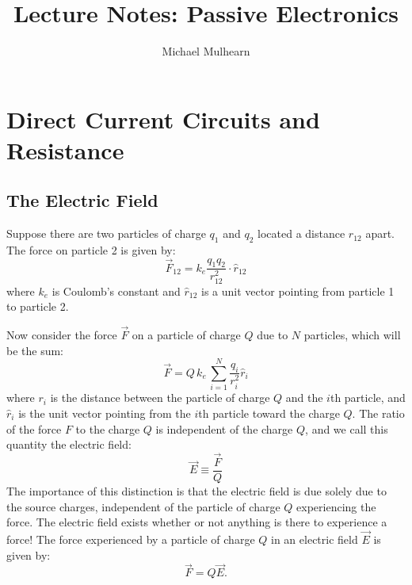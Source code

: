\documentclass[12pt,oneside]{book}
\begin{document}

\title{Lecture Notes:  Passive Electronics}
\author{Michael Mulhearn}

\maketitle

\chapter{Direct Current Circuits and Resistance}

\section{The Electric Field}

Suppose there are two particles of charge $q_1$ and $q_2$ located a distance $r_{12}$ apart.
The force on particle 2 is given by:
\begin{displaymath}
\vec{F}_{12} = k_e \frac{q_1 q_2}{r_{12}^2} \cdot \hat{r}_{12}
\end{displaymath}
where $k_e$ is Coulomb's constant and $\hat{r}_{12}$ is a unit vector pointing from particle 1 to particle 2.

Now consider the force $\vec{F}$ on a particle of charge $Q$ due to $N$ particles, which will be the sum:
\begin{displaymath}
\vec{F} = Q \, k_e \, \sum_{i=1}^N \frac{q_i}{r_{i}^2} \hat{r}_{i}
\end{displaymath}
where $r_i$ is the distance between the particle of charge $Q$ and the $i$th particle, and $\hat{r}_i$ is the unit vector pointing from the $i$th particle toward the charge $Q$.  The ratio of the force $F$ to the charge $Q$ is independent of the charge $Q$, and we call this quantity the electric field:
\begin{displaymath}
\vec{E} \equiv \frac{\vec{F}}{Q}
\end{displaymath}
The importance of this distinction is that the electric field is due solely due to the source charges, independent of the particle of charge $Q$ experiencing the force.  The electric field exists whether or not anything is there to experience a force!  The force experienced by a particle of charge $Q$ in an electric field $\vec{E}$ is given by:
\begin{displaymath}
\vec{F} = Q \vec{E}.
\end{displaymath}
\end{document}
